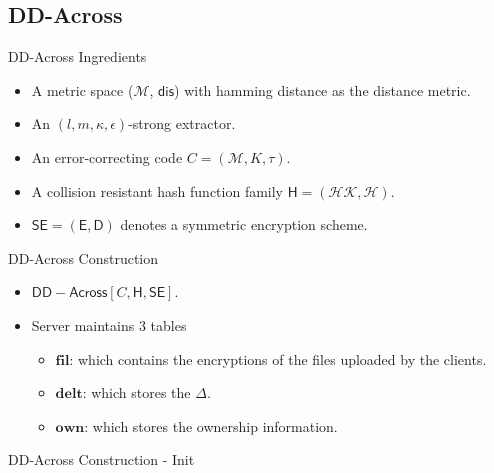 \documentclass{beamer}
\newcommand{\scheme}{\mathsf{DD-Across}}
\newcommand{\msgspc}{\mathcal{M}}
\begin{document}
\subsection{DD-Across}

\begin{frame}{DD-Across Ingredients}
	\begin{itemize}
		\setlength\itemsep{1em}
		\item A metric space ($\msgspc$, $\mathsf{dis}$)  with hamming distance as the distance metric.
        \item An $(l,m,\kappa,\epsilon)$-strong extractor.
        \item An error-correcting code $C = (\msgspc, K, \tau)$.
        \item A collision resistant hash function family $\mathsf{H}=(\mathcal{HK, H})$.
        \item $\mathsf{SE = (E,D)}$ denotes a symmetric encryption scheme.
	\end{itemize}
\end{frame}

\begin{frame}{DD-Across Construction}
	\begin{itemize}
		\setlength\itemsep{1em}
		\item $\scheme [C, \mathsf{H}, \mathsf{SE}]$.
		\item Server maintains 3 tables
		\begin{itemize}
		\item $\textbf{fil}$: which contains the encryptions of the files uploaded by the clients.
		\item $\textbf{delt}$: which stores the $\Delta$.
		\item $\textbf{own}$: which stores the ownership information.
		\end{itemize}
	\end{itemize}
\end{frame}

\begin{frame}{DD-Across Construction - Init}
		\begin{figure}[H]
    \centering
	\end{figure}
\end{frame}
\end{document}
